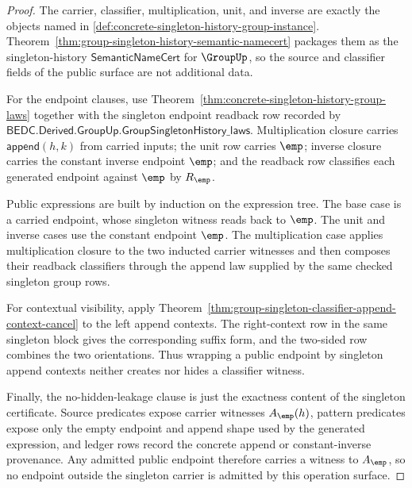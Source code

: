 \begin{proof}
The carrier, classifier, multiplication, unit, and inverse are exactly the
objects named in \autoref{def:concrete-singleton-history-group-instance}.
Theorem~\ref{thm:group-singleton-history-semantic-namecert} packages them as
the singleton-history $\mathsf{SemanticNameCert}$ for $\GroupUp$, so the source
and classifier fields of the public surface are not additional data.

For the endpoint clauses, use
Theorem~\ref{thm:concrete-singleton-history-group-laws} together with the
singleton endpoint readback row recorded by
$\mathsf{BEDC.Derived.GroupUp.GroupSingletonHistory\_laws}$. Multiplication
closure carries $\mathsf{append}(h,k)$ from carried inputs; the unit row carries
$\emp$; inverse closure carries the constant inverse endpoint $\emp$; and the
readback row classifies each generated endpoint against $\emp$ by $R_{\emp}$.

Public expressions are built by induction on the expression tree. The base
case is a carried endpoint, whose singleton witness reads back to $\emp$. The
unit and inverse cases use the constant endpoint $\emp$. The multiplication
case applies multiplication closure to the two inducted carrier witnesses and
then composes their readback classifiers through the append law supplied by the
same checked singleton group rows.

For contextual visibility, apply
Theorem~\ref{thm:group-singleton-classifier-append-context-cancel} to the left
append contexts. The right-context row in the same singleton block gives the
corresponding suffix form, and the two-sided row combines the two orientations.
Thus wrapping a public endpoint by singleton append contexts neither creates
nor hides a classifier witness.

Finally, the no-hidden-leakage clause is just the exactness content of the
singleton certificate. Source predicates expose carrier witnesses
$A_{\emp}(h)$, pattern predicates expose only the empty endpoint and append
shape used by the generated expression, and ledger rows record the concrete
append or constant-inverse provenance. Any admitted public endpoint therefore
carries a witness to $A_{\emp}$, so no endpoint outside the singleton carrier
is admitted by this operation surface.
\end{proof}
